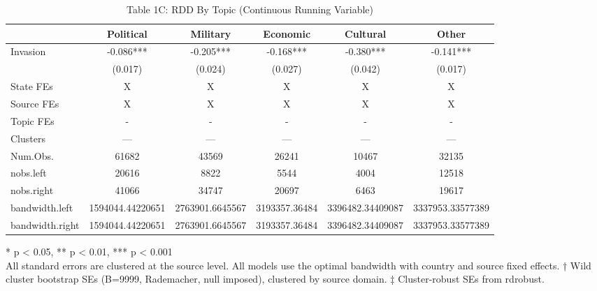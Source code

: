 \begin{table}[!t]
\caption{Table 1C: RDD By Topic (Continuous Running Variable)} 
\fontsize{12.0pt}{14.4pt}\selectfont
\begin{tabular*}{\linewidth}{@{\extracolsep{\fill}}lccccc}
\toprule
  & Political & Military & Economic & Cultural & Other \\ 
\midrule\addlinespace[2.5pt]
Invasion & -0.086*** & -0.205*** & -0.168*** & -0.380*** & -0.141*** \\ 
{} & {(0.017)} & {(0.024)} & {(0.027)} & {(0.042)} & {(0.017)} \\ 
State FEs & X & X & X & X & X \\ 
Source FEs & X & X & X & X & X \\ 
Topic FEs & - & - & - & - & - \\ 
Clusters & — & — & — & — & — \\ 
Num.Obs. & 61682 & 43569 & 26241 & 10467 & 32135 \\ 
nobs.left & 20616 & 8822 & 5544 & 4004 & 12518 \\ 
nobs.right & 41066 & 34747 & 20697 & 6463 & 19617 \\ 
bandwidth.left & 1594044.44220651 & 2763901.6645567 & 3193357.36484 & 3396482.34409087 & 3337953.33577389 \\ 
bandwidth.right & 1594044.44220651 & 2763901.6645567 & 3193357.36484 & 3396482.34409087 & 3337953.33577389 \\ 
\bottomrule
\end{tabular*}
\begin{minipage}{\linewidth}
* p < 0.05, ** p < 0.01, *** p < 0.001\\
All standard errors are clustered at the source level. All models use the
optimal bandwidth with country and source fixed effects. † Wild cluster
bootstrap SEs (B=9999, Rademacher, null imposed), clustered by source domain. ‡
Cluster-robust SEs from rdrobust.\\
\end{minipage}
\end{table}

